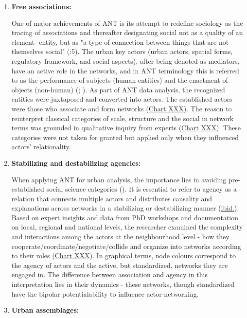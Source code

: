 \documentclass[11pt]{report}
\begin{document}
\begin{enumerate}
\item \textbf{Free associations:}

One of major achievements of ANT is its attempt to redefine sociology as the tracing of associations and thereafter designating social not as a quality of an element- entity, but as "a type of connection between things that are not themselves social"  (\href{Latour}{\citealt{latour_science_2005}}:5).
The urban key actors (urban actors, spatial forms, regulatory framework, and social aspects), after being denoted as mediators, have an active role in the networks, and in ANT terminology this is referred to as the performance of subjects (human entities) and the enactment of objects (non-human) (\href{Callon}{\citealt{callon_elements_1986}}; \href{Farias}{\citealt{farias_introduction:_2011}}). As part of ANT data analysis, the recognized entities were juxtaposed and converted into actors.  The established actors were those who associate and form networks (\href{Table ANT discource analysos}{Chart XXX}). The reason to reinterpret classical categories of scale, structure and the social in network terms was grounded in qualitative inquiry from experts (\href{Table data sources}{Chart XXX}). These categories were not taken for granted but applied only when they influenced actors’ relationality.

\item \textbf{Stabilizing and destabilizing agencies:}

When applying ANT for urban analysis, the importance lies in avoiding pre-established social science categories (\href{Farias}{\citealt{farias_introduction:_2011}}). It is essential to refer to agency as a relation that connects multiple actors and distributes causality and explanations across networks in a stabilizing or destabilizing manner  (\href{ref}{ibid.}). 
Based on expert insights and data from PhD workshops and documentation on local, regional and national levels, the researcher examined the complexity and interactions among the actors at the neighbourhood level - how they cooperate/coordinate/negotiate/collide and organize into networks according to their roles (\href{Table ANT discource analysos}{Chart XXX}). In graphical terms, node colours correspond to the agency of actors and the active, but standardized, networks they are engaged in. The difference between association and agency in this interpretation lies in their dynamics - these networks, though standardized have the bipolar potentialability to influence actor-networking.

\item \textbf{Urban assemblages:}


\end{enumerate}
\end{document}
